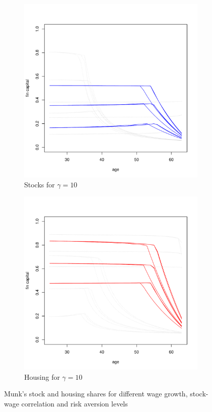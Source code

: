 \begin{figure}[H]\ContinuedFloat
    \begin{subfigure}{0.45\textwidth}
		\centering
		\includegraphics[scale=0.25]{figs/smunkhouse10.pdf}
		\caption{Stocks for $\gamma = 10$}
	\end{subfigure}
	\hfill
    \begin{subfigure}{0.45\textwidth}
		\centering
		\includegraphics[scale=0.25]{figs/hmunkhouse10.pdf}
		\caption{Housing for $\gamma = 10$}
	\end{subfigure}
	\caption{Munk's stock and housing shares for different wage growth, stock-wage correlation and risk aversion levels}
	\label{fig:munkh}
\end{figure}
